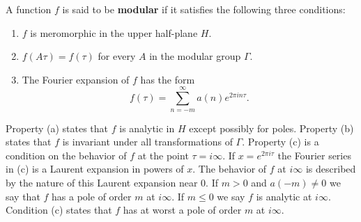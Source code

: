 A function $f$ is said to be \textbf{modular} if it satisfies the following three conditions:

\begin{enumerate}
\item[(a)] $f$ is meromorphic in the upper half-plane $H$.
\item[(b)] $f(A\tau) = f(\tau)$ for every $A$ in the modular group $\Gamma$.
\item[(c)] The Fourier expansion of $f$ has the form
$$f(\tau) = \sum_{n=-m}^{\infty} a(n)e^{2\pi i n \tau}.$$
\end{enumerate}

Property (a) states that $f$ is analytic in $H$ except possibly for poles. Property (b) states that $f$ is invariant under all transformations of $\Gamma$. Property (c) is a condition on the behavior of $f$ at the point $\tau = i\infty$. If $x = e^{2\pi i \tau}$ the Fourier series in (c) is a Laurent expansion in powers of $x$. The behavior of $f$ at $i\infty$ is described by the nature of this Laurent expansion near $0$. If $m > 0$ and $a(-m) \neq 0$ we say that $f$ has a pole of order $m$ at $i\infty$. If $m \leq 0$ we say $f$ is analytic at $i\infty$. Condition (c) states that $f$ has at worst a pole of order $m$ at $i\infty$.
